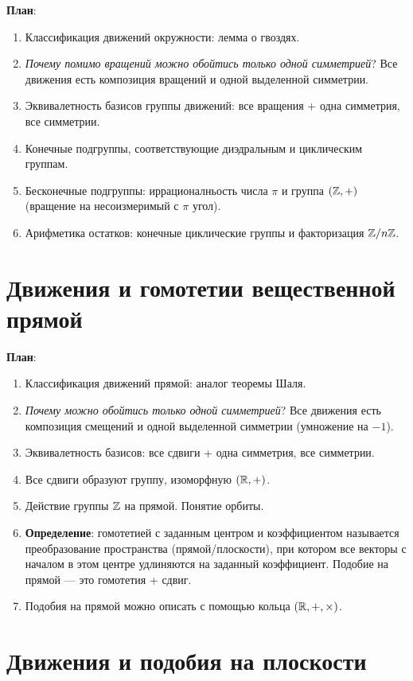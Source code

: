 \textbf{План}:
\begin{enumerate}
\item Классификация движений окружности: лемма о гвоздях.
\item \textit{Почему помимо вращений можно обойтись только одной симметрией}? Все движения есть композиция вращений и одной выделенной симметрии.
\item Эквивалетность базисов группы движений: все вращения + одна симметрия, все симметрии.
\item Конечные подгруппы, соответствующие диэдральным и циклическим группам.
\item Бесконечные подгруппы: иррационалньость числа $\pi$ и группа $(\mathbb Z,+)$ (вращение на несоизмеримый с $\pi$ угол).
\item Арифметика остатков: конечные циклические группы и факторизация $\mathbb Z/n\mathbb Z$.
\end{enumerate}



\section{Движения и гомотетии вещественной прямой}



\textbf{План}:
\begin{enumerate}
\item Классификация движений прямой: аналог теоремы Шаля.
\item \textit{Почему можно обойтись только одной симметрией}? Все движения есть композиция смещений и одной выделенной симметрии (умножение на $-1$).
\item Эквивалетность базисов: все сдвиги + одна симметрия, все симметрии.
\item Все сдвиги образуют группу, изоморфную $(\mathbb R,+)$.
\item Действие группы $\mathbb Z$ на прямой. Понятие орбиты.
\item \textbf{Определение}: гомотетией с заданным центром и коэффициентом называется преобразование пространства (прямой/плоскости), при котором все векторы с началом в этом центре удлиняются на заданный коэффициент. Подобие на прямой --- это гомотетия + сдвиг.
\item Подобия на прямой можно описать с помощью кольца $(\mathbb R,+,\times)$.
\end{enumerate}



\section{Движения и подобия на плоскости}

